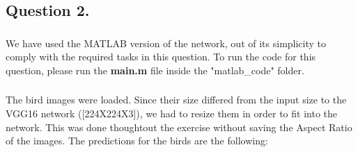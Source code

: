 \documentclass[a4paper]{iacas}
\begin{document}
\newpage
\subsection{Question 2.}
\subsubsection{}
We have used the MATLAB version of the network, out of its simplicity to comply with the required tasks in this question. To run the code for this question, please run the \textbf{main.m} file inside the "matlab\_code" folder. 

\subsubsection{}
The bird images were loaded. Since their size differed from the input size to the VGG16 network ([224X224X3]), we had to resize them in order to fit into the network. This was done thoughtout the exercise without saving the Aspect Ratio of the images. The predictions for the birds are the following:
\end{document}
